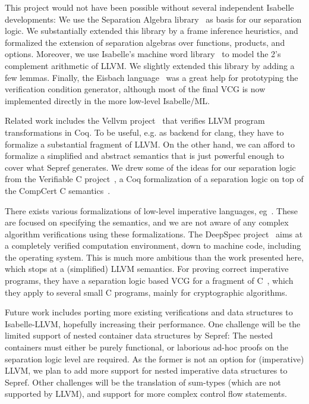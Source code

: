 \documentclass[a4paper,USenglish,cleveref, autoref]{lipics-v2019}
\begin{document}
This project would not have been possible without several independent Isabelle developments:
We use the Separation Algebra library~\cite{KKB12_afp,KKB12} as basis for our separation logic. We substantially extended this library by a 
frame inference heuristics, and formalized the extension of separation algebras over functions, products, and options. 
Moreover, we use Isabelle's machine word library~\cite{Word_Lib-AFP} to model the 2's complement arithmetic of LLVM. We slightly extended this library by adding a few lemmas. Finally, the Eisbach language~\cite{MMW16} was a great help for prototyping the verification condition generator, although most of the 
final VCG is now implemented directly in the more low-level Isabelle/ML.

Related work includes the Vellvm project~\cite{ZNMZ12,ZNMZ13} that verifies LLVM program transformations in Coq.
To be useful, e.g. as backend for clang, they have to formalize a substantial fragment of LLVM. 
On the other hand, we can afford to formalize a simplified and abstract semantics that 
is just powerful enough to cover what Sepref generates.
We drew some of the ideas for our separation logic from the Verifiable C project~\cite{App14}, 
a Coq formalization of a separation logic on top of the CompCert C semantics~\cite{BL09}.

There exists various formalizations of low-level imperative languages, eg~\cite{Loch12,Watt18}. 
These are focused on specifying the semantics, and we are not aware of any complex 
algorithm verifications using these formalizations.
The DeepSpec project~\cite{deepspec} aims at a completely verified computation environment, 
down to machine code, including the operating system. 
This is much more ambitious than the work presented here, which stops at a (simplified) LLVM semantics.
For proving correct imperative programs, they have a separation logic based VCG for a fragment of C~\cite{App14,CBGD18},
which they apply to several small C programs, mainly for cryptographic algorithms. 

Future work includes porting more existing verifications and data structures to Isabelle-LLVM, hopefully increasing their performance. 
One challenge will be the limited support of nested container data structures by Sepref: The nested containers must either be 
purely functional, or laborious ad-hoc proofs on the separation logic level are required. 
As the former is not an option for (imperative) LLVM, we plan to add more support for nested imperative data structures to Sepref. 
Other challenges will be the translation of sum-types (which are not supported by LLVM), and support for more 
complex control flow statements.
\end{document}

